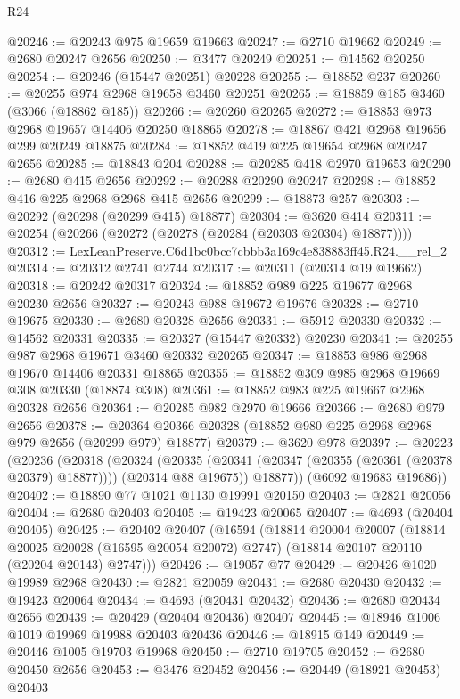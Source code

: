 \begin{lexlean}{R24}
\begin{coremodule}
@20246 := @20243 @975 @19659 @19663
@20247 := @2710 @19662
@20249 := @2680 @20247 @2656
@20250 := @3477 @20249
@20251 := @14562 @20250
@20254 := @20246 (@15447 @20251) @20228
@20255 := @18852 @237
@20260 := @20255 @974 @2968 @19658 @3460 @20251
@20265 := @18859 @185 @3460 (@3066 (@18862 @185))
@20266 := @20260 @20265
@20272 := @18853 @973 @2968 @19657 @14406 @20250 @18865
@20278 := @18867 @421 @2968 @19656 @299 @20249 @18875
@20284 := @18852 @419 @225 @19654 @2968 @20247 @2656
@20285 := @18843 @204
@20288 := @20285 @418 @2970 @19653
@20290 := @2680 @415 @2656
@20292 := @20288 @20290 @20247
@20298 := @18852 @416 @225 @2968 @2968 @415 @2656
@20299 := @18873 @257
@20303 := @20292 (@20298 (@20299 @415) @18877)
@20304 := @3620 @414
@20311 := @20254 (@20266 (@20272 (@20278 (@20284 (@20303 @20304) @18877))))
@20312 := LexLeanPreserve.C6d1bc0bcc7cbbb3a169c4e838883ff45.R24.__rel_2
@20314 := @20312 @2741 @2744
@20317 := @20311 (@20314 @19 @19662)
@20318 := @20242 @20317
@20324 := @18852 @989 @225 @19677 @2968 @20230 @2656
@20327 := @20243 @988 @19672 @19676
@20328 := @2710 @19675
@20330 := @2680 @20328 @2656
@20331 := @5912 @20330
@20332 := @14562 @20331
@20335 := @20327 (@15447 @20332) @20230
@20341 := @20255 @987 @2968 @19671 @3460 @20332 @20265
@20347 := @18853 @986 @2968 @19670 @14406 @20331 @18865
@20355 := @18852 @309 @985 @2968 @19669 @308 @20330 (@18874 @308)
@20361 := @18852 @983 @225 @19667 @2968 @20328 @2656
@20364 := @20285 @982 @2970 @19666
@20366 := @2680 @979 @2656
@20378 := @20364 @20366 @20328 (@18852 @980 @225 @2968 @2968 @979 @2656 (@20299 @979) @18877)
@20379 := @3620 @978
@20397 := @20223
    (@20236
      (@20318
        (@20324
          (@20335 (@20341 (@20347 (@20355 (@20361 (@20378 @20379) @18877)))) (@20314 @88 @19675))
          @18877))
      (@6092 @19683 @19686))
@20402 := @18890 @77 @1021 @1130 @19991 @20150
@20403 := @2821 @20056
@20404 := @2680 @20403
@20405 := @19423 @20065
@20407 := @4693 (@20404 @20405)
@20425 := @20402
    @20407
    (@16594
      (@18814
        @20004
        @20007
        (@18814 @20025 @20028 (@16595 @20054 @20072) @2747)
        (@18814 @20107 @20110 (@20204 @20143) @2747)))
@20426 := @19057 @77
@20429 := @20426 @1020 @19989 @2968
@20430 := @2821 @20059
@20431 := @2680 @20430
@20432 := @19423 @20064
@20434 := @4693 (@20431 @20432)
@20436 := @2680 @20434 @2656
@20439 := @20429 (@20404 @20436) @20407
@20445 := @18946 @1006 @1019 @19969 @19988 @20403 @20436
@20446 := @18915 @149
@20449 := @20446 @1005 @19703 @19968
@20450 := @2710 @19705
@20452 := @2680 @20450 @2656
@20453 := @3476 @20452
@20456 := @20449 (@18921 @20453) @20403

\end{coremodule}
\end{lexlean}
